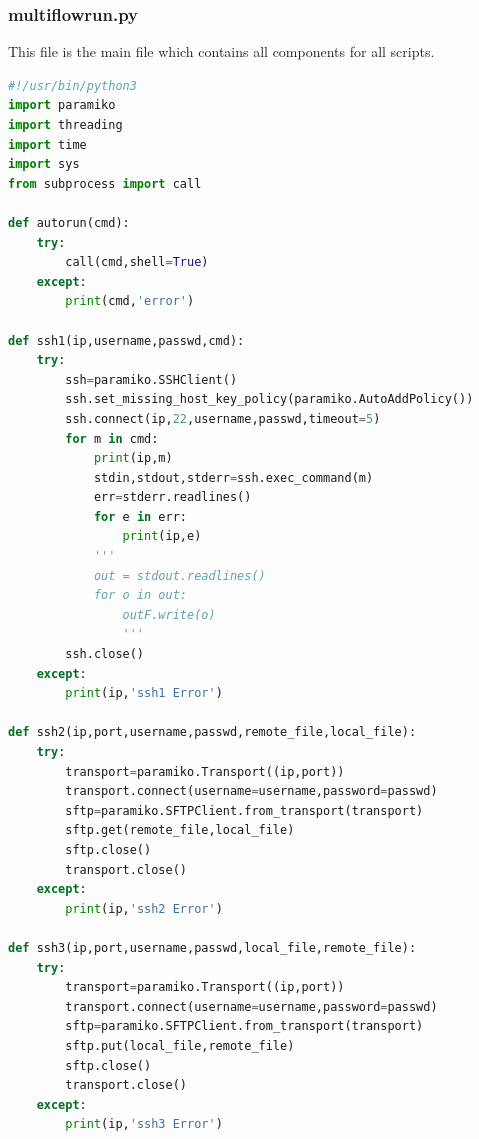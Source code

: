 \documentclass[12pt,a4paper]{article}
\begin{document}
\subsubsection*{multiflowrun.py}
This file is the main file which contains all components for all scripts.
\begin{lstlisting}[language=Python]
#!/usr/bin/python3
import paramiko
import threading
import time
import sys
from subprocess import call

def autorun(cmd):
    try:
        call(cmd,shell=True)
    except:
        print(cmd,'error')

def ssh1(ip,username,passwd,cmd):
    try:
        ssh=paramiko.SSHClient()
        ssh.set_missing_host_key_policy(paramiko.AutoAddPolicy())
        ssh.connect(ip,22,username,passwd,timeout=5)
        for m in cmd:
            print(ip,m)
            stdin,stdout,stderr=ssh.exec_command(m)
            err=stderr.readlines()
            for e in err:
                print(ip,e)
            '''
            out = stdout.readlines()
            for o in out:
                outF.write(o)
                '''
        ssh.close()
    except:
        print(ip,'ssh1 Error')

def ssh2(ip,port,username,passwd,remote_file,local_file):
    try:
        transport=paramiko.Transport((ip,port))
        transport.connect(username=username,password=passwd)
        sftp=paramiko.SFTPClient.from_transport(transport)
        sftp.get(remote_file,local_file)
        sftp.close()
        transport.close()
    except:
        print(ip,'ssh2 Error')

def ssh3(ip,port,username,passwd,local_file,remote_file):
    try:
        transport=paramiko.Transport((ip,port))
        transport.connect(username=username,password=passwd)
        sftp=paramiko.SFTPClient.from_transport(transport)
        sftp.put(local_file,remote_file)
        sftp.close()
        transport.close()
    except:
        print(ip,'ssh3 Error')


\end{lstlisting}
\end{document}
